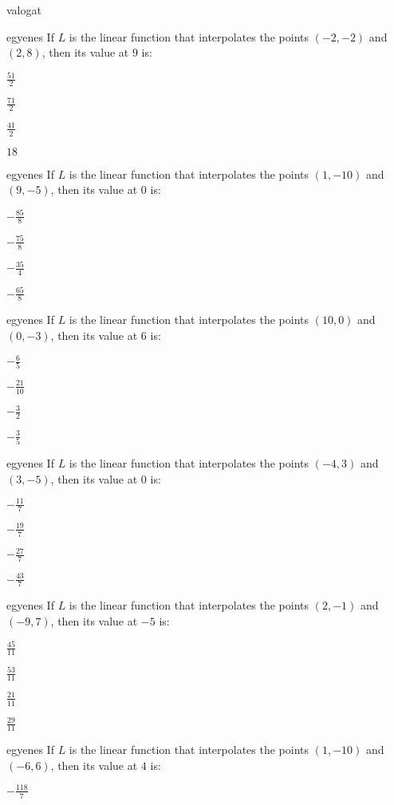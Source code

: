 \documentclass[12pt]{article}
\begin{document}
\begin{quiz}{valogat}
\begin{multi}{egyenes}
If $L$ is the linear function that interpolates the points
$(-2,-2)$ and $(2,8)$, then its value at $9$ is:
\item* $ \frac{51}{2} $
\item  $ \frac{71}{2} $
\item  $ \frac{41}{2} $
\item  $ 18 $
\end{multi}
\begin{multi}{egyenes}
If $L$ is the linear function that interpolates the points
$(1,-10)$ and $(9,-5)$, then its value at $0$ is:
\item* $ -\frac{85}{8} $
\item  $ -\frac{75}{8} $
\item  $ -\frac{35}{4} $
\item  $ -\frac{65}{8} $
\end{multi}
\begin{multi}{egyenes}
If $L$ is the linear function that interpolates the points
$(10,0)$ and $(0,-3)$, then its value at $6$ is:
\item* $ -\frac{6}{5} $
\item  $ -\frac{21}{10} $
\item  $ -\frac{3}{2} $
\item  $ -\frac{3}{5} $
\end{multi}
\begin{multi}{egyenes}
If $L$ is the linear function that interpolates the points
$(-4,3)$ and $(3,-5)$, then its value at $0$ is:
\item* $ -\frac{11}{7} $
\item  $ -\frac{19}{7} $
\item  $ -\frac{27}{7} $
\item  $ -\frac{43}{7} $
\end{multi}
\begin{multi}{egyenes}
If $L$ is the linear function that interpolates the points
$(2,-1)$ and $(-9,7)$, then its value at $-5$ is:
\item* $ \frac{45}{11} $
\item  $ \frac{53}{11} $
\item  $ \frac{21}{11} $
\item  $ \frac{29}{11} $
\end{multi}
\begin{multi}{egyenes}
If $L$ is the linear function that interpolates the points
$(1,-10)$ and $(-6,6)$, then its value at $4$ is:
\item* $ -\frac{118}{7} $

\end{multi}
\end{quiz}
\end{document}

